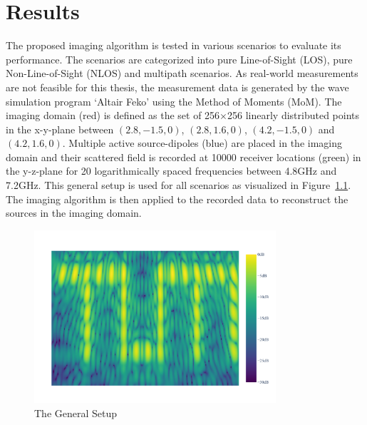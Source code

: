 
\chapter{Results}\label{chapter:results}
The proposed imaging algorithm is tested in various scenarios to evaluate its performance.
The scenarios are categorized into pure Line-of-Sight (LOS), pure Non-Line-of-Sight (NLOS) and multipath scenarios.
As real-world measurements are not feasible for this thesis, the measurement data is generated by the wave simulation program `Altair Feko' using the Method of Moments (MoM).
The imaging domain (red) is defined as the set of 256\(\times \)256 linearly distributed points in the x-y-plane between \((2.8, -1.5, 0)\), \((2.8, 1.6, 0)\), \((4.2, -1.5, 0)\) and \((4.2, 1.6, 0)\).
Multiple active source-dipoles (blue) are placed in the imaging domain and their scattered field is recorded at 10000 receiver locations (green) in the y-z-plane for 20 logarithmically spaced frequencies between 4.8GHz and 7.2GHz.
This general setup is used for all scenarios as visualized in Figure~\ref{fig:general_setup}.
The imaging algorithm is then applied to the recorded data to reconstruct the sources in the imaging domain.

\begin{figure}[ht]
    \centering
    \includegraphics[page=3, width=0.8\textwidth]{figures/pure_los.pdf}
    \caption{The General Setup}\label{fig:general_setup}
\end{figure}


